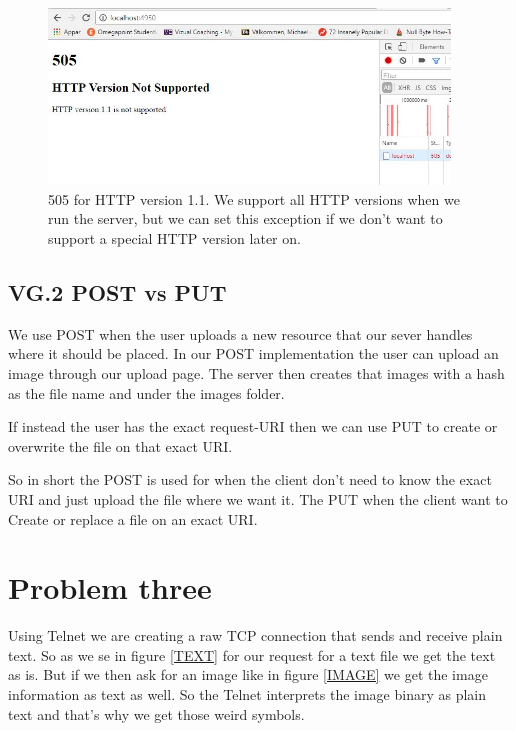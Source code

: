 \documentclass[a4paper,12pt]{article}
\numberwithin{figure}{section}
\begin{document}
\begin{figure}[h!]
	\centering
	\label{505}
	\includegraphics[width=0.95\textwidth,keepaspectratio]{img/505.jpg} 
	\caption{505 for HTTP version 1.1. We support all HTTP versions when we run the server, but we can set this exception if we don't want to support a special HTTP version later on.}
\end{figure}

\newpage
\subsection{VG.2 POST vs PUT}

We use POST when the user uploads a new resource that our sever handles where it should be placed. In our POST implementation the user can upload an image through our upload page. The server then creates that images with a hash as the file name and under the images folder.  

If instead the user has the exact request-URI then we can use PUT to create or overwrite the file on that exact URI. 

So in short the POST is used for when the client don't need to know the exact URI and just upload the file where we want it. The PUT when the client want to Create or replace a file on an exact URI.

\newpage

\section{Problem three}

Using Telnet we are creating a raw TCP connection that sends and receive plain text. So as we se in figure \ref{TEXT} for our request for a text file we get the text as is. But if we then ask for an image like in figure \ref{IMAGE} we get the image information as text as well. So the Telnet interprets the image binary as plain text and that's why we get those weird symbols.
\end{document}
